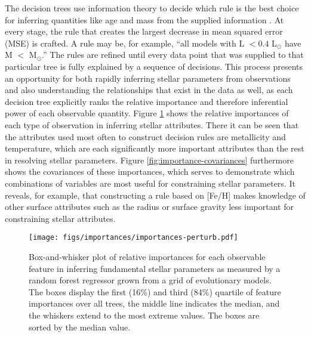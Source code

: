 \documentclass[iop,apj,twocolappendix]{emulateapj}
\begin{document}
The decision trees use information theory to decide which rule is the best choice for inferring quantities like age and mass from the supplied information \citep[see chapter 9 of][]{hastie2005elements}. At every stage, the rule that creates the largest decrease in mean squared error (MSE) is crafted. A rule may be, for example, ``all models with L $<0.4$ L$_\odot$ have M $<$ M$_\odot$.'' The rules are refined until every data point that was supplied to that particular tree is fully explained by a sequence of decisions. This process presents an opportunity for both rapidly inferring stellar parameters from observations and also understanding the relationships that exist in the data as well, as each decision tree explicitly ranks the relative importance and therefore inferential power of each observable quantity. Figure \ref{fig:importances} shows the relative importances of each type of observation in inferring stellar attributes. There it can be seen that the attributes used most often to construct decision rules are metallicity and temperature, which are each significantly more important attributes than the rest in resolving stellar parameters. Figure \ref{fig:importance-covariances} furthermore shows the covariances of these importances, which serves to demonstrate which combinations of variables are most useful for constraining stellar parameters. It reveals, for example, that constructing a rule based on [Fe/H] makes knowledge of other surface attributes such as the radius or surface gravity less important for constraining stellar attributes. 

\begin{figure}
    \centering
    \texttt{[image: figs/importances/importances-perturb.pdf]}
    \caption{Box-and-whisker plot of relative importances for each observable feature in inferring fundamental stellar parameters as measured by a random forest regressor grown from a grid of evolutionary models. The boxes display the first (16\%) and third (84\%) quartile of feature importances over all trees, the middle line indicates the median, and the whiskers extend to the most extreme values. The boxes are sorted by the median value.}
    \label{fig:importances}
\end{figure}
\end{document}
